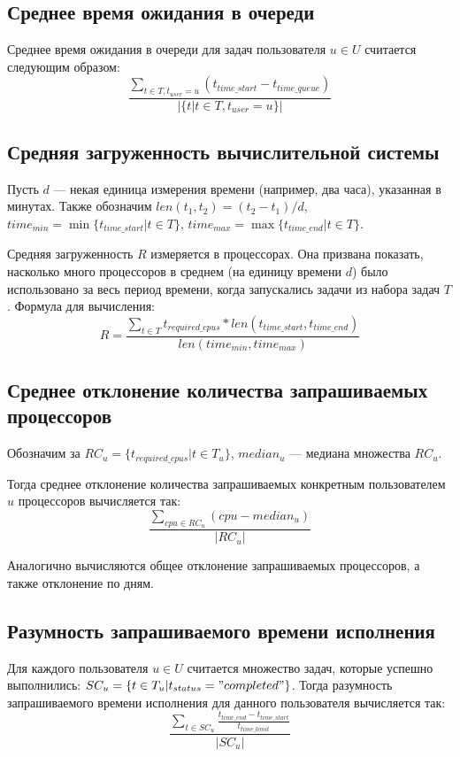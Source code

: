 \documentclass[12pt]{article}
\begin{document}
	\subsection{Среднее время ожидания в очереди}
	Среднее время ожидания в очереди для задач пользователя $u \in U$ считается следующим образом:
	$$ \frac{\sum_{t \in T, t_{user}=u} {(t_{time\_start} - t_{time\_queue})}}{|\{t|t \in T, t_{user} = u\}|} $$
	
	\subsection{Средняя загруженность вычислительной системы}
	Пусть $d$ --- некая единица измерения времени (например, два часа), указанная в минутах. Также обозначим $len(t_1, t_2) = (t_2 - t_1) / d$,
	$time_{min} = \min \{t_{time\_start}| t \in T\}$, $time_{max} = \max \{t_{time\_end}| t \in T\}$.
	
	Средняя загруженность $R$ измеряется в процессорах. Она призвана показать, насколько много процессоров в среднем (на единицу времени $d$) было
	 использовано за весь период времени, когда запускались задачи из набора задач $T$. Формула для вычисления:
	 $$ R = \frac{\sum_{t \in T} {t_{required\_cpus} * len(t_{time\_start}, t_{time\_end})}}{len(time_{min}, time_{max})}$$
	 
	\subsection{Среднее отклонение количества запрашиваемых процессоров}
	Обозначим за $RC_u = \{t_{required\_cpus}|t \in T_u\}$, $median_u$ 
	---	медиана множества $RC_u$. 
	
	Тогда среднее отклонение количества запрашиваемых конкретным пользователем $u$ процессоров вычисляется так:
	$$ \frac{\sum_{cpu \in RC_u} (cpu - median_u)}{|RC_u|} $$
	
	Аналогично вычисляются общее отклонение запрашиваемых процессоров, а также отклонение по дням.
	
	\subsection{Разумность запрашиваемого времени исполнения}
	Для каждого пользователя $u \in U$ считается множество задач, которые успешно выполнились: $SC_u = \{t \in T_u| t_{status} = "completed"\}$.
	Тогда разумность запрашиваемого времени исполнения для данного пользователя вычисляется так:
	$$ \frac{\sum_{t \in SC_u} \frac{t_{time\_end} - t_{time\_start}}{t_{time\_limit}}}{|SC_u|} $$
 
        
\end{document}
